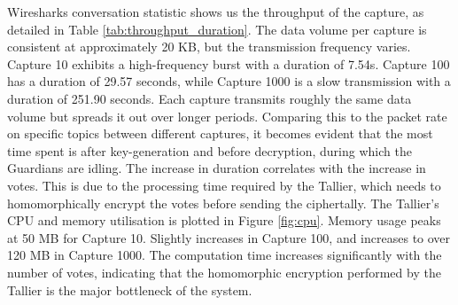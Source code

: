 Wiresharks conversation statistic shows us the throughput of the capture, as detailed in Table \ref{tab:throughput_duration}. The data volume per capture is consistent at approximately 20 KB, but the transmission frequency varies. Capture 10 exhibits a high-frequency burst with a duration of 7.54s. Capture 100 has a duration of 29.57 seconds, while Capture 1000 is a slow transmission with a duration of 251.90 seconds. Each capture transmits roughly the same data volume but spreads it out over longer periods.  Comparing this to the packet rate on specific topics between different captures, it becomes evident that the most time spent is after key-generation and before decryption, during which the Guardians are idling. The increase in duration correlates with the increase in votes. This is due to the processing time required by the Tallier, which needs to homomorphically encrypt the votes before sending the ciphertally. The Tallier's CPU and memory utilisation is plotted in Figure \ref{fig:cpu}. Memory usage peaks at 50 MB for Capture 10. Slightly increases in Capture 100, and increases to over 120 MB in Capture 1000. The computation time increases significantly with the number of votes, indicating that the homomorphic encryption performed by the Tallier is the major bottleneck of the system.

\nocite{*}


